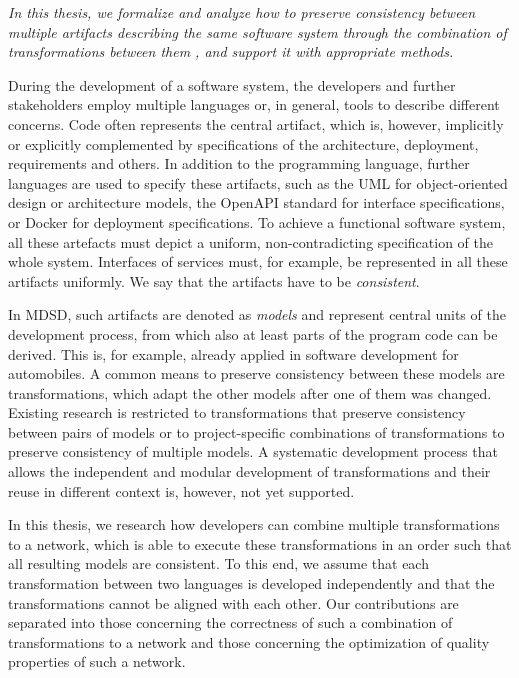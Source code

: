 \emph{In this thesis, we formalize and analyze how to preserve consistency between multiple artifacts describing the same software system through the combination of transformations between them%
, and support it with appropriate methods.}

During the development of a software system, the developers and further stakeholders employ multiple languages or, in general, tools to describe different concerns.
Code often represents the central artifact, which is, however, implicitly or explicitly complemented by specifications of the architecture, deployment, requirements and others.
In addition to the programming language, further languages are used to specify these artifacts, such as the \acrshort{UML} for object-oriented design or architecture models, the OpenAPI standard for interface specifications, or Docker for deployment specifications.
To achieve a functional software system, all these artefacts must depict a uniform, non-contradicting specification of the whole system.
Interfaces of services must, for example, be represented in all these artifacts uniformly.
We say that the artifacts have to be \emph{consistent}.

In \acrlong{MDSD}, such artifacts are denoted as \emph{models} and represent central units of the development process, from which also at least parts of the program code can be derived.
This is, for example, already applied in software development for automobiles.
A common means to preserve consistency between these models are transformations, which adapt the other models after one of them was changed.
Existing research is restricted to transformations that preserve consistency between pairs of models or to project-specific combinations of transformations to preserve consistency of multiple models.
A systematic development process that allows the independent and modular development of transformations and their reuse in different context is, however, not yet supported.

In this thesis, we research how developers can combine multiple transformations to a network, which is able to execute these transformations in an order such that all resulting models are consistent.
To this end, we assume that each transformation between two languages is developed independently and that the transformations cannot be aligned with each other.
Our contributions are separated into those concerning the correctness of such a combination of transformations to a network and those concerning the optimization of quality properties of such a network.

